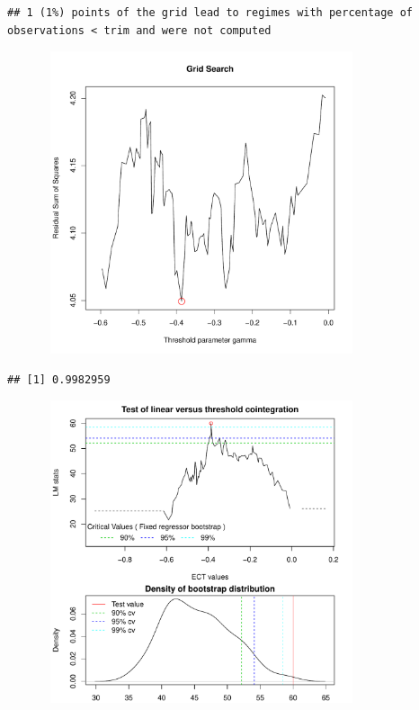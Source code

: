 \documentclass[12pt, twoside]{book}\usepackage[]{graphicx}\usepackage[]{color}
\makeatletter
\newenvironment{kframe}{%
 \def\at@end@of@kframe{}%
 \ifinner\ifhmode%
  \def\at@end@of@kframe{\end{minipage}}%
  \begin{minipage}{\columnwidth}%
 \fi\fi%
 \def\FrameCommand##1{\hskip\@totalleftmargin \hskip-\fboxsep
 \colorbox{shadecolor}{##1}\hskip-\fboxsep
     \hskip-\linewidth \hskip-\@totalleftmargin \hskip\columnwidth}%
 \MakeFramed {\advance\hsize-\width
   \@totalleftmargin\z@ \linewidth\hsize
   \@setminipage}}%
 {\par\unskip\endMakeFramed%
 \at@end@of@kframe}
\newenvironment{knitrout}{}{} %
\numberwithin{equation}{section}
\numberwithin{theorem}{section}
\numberwithin{teorema}{section}
\numberwithin{defi}{section}
\numberwithin{prop}{section}
\numberwithin{defi}{section}
\theoremstyle{plain}
\makeatother
\begin{document}
\begin{knitrout}
\color{fgcolor}\begin{kframe}
\begin{verbatim}
## 1 (1%) points of the grid lead to regimes with percentage of observations < trim and were not computed
\end{verbatim}
\end{kframe}

{\centering \includegraphics[width=4.5in,height=3.5in]{figure/Modelo_restringido-1} 

}



\end{knitrout}


\begin{knitrout}
\color{fgcolor}\begin{kframe}
\begin{verbatim}
## [1] 0.9982959
\end{verbatim}
\end{kframe}
\end{knitrout}


\begin{knitrout}
\color{fgcolor}

{\centering \includegraphics[width=4.5in,height=3.5in]{figure/unnamed-chunk-25-1} 

}



\end{knitrout}
\end{document}
